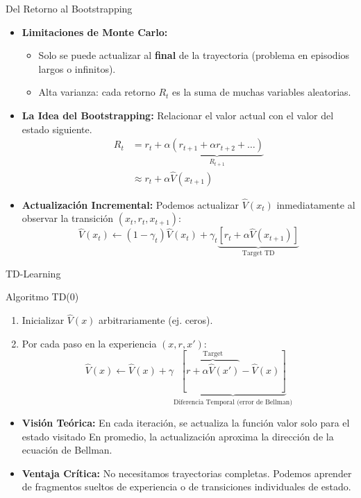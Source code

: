 \documentclass[xcolor=dvipsnames, handout]{beamer}
\begin{document}
\begin{frame}{Del Retorno al Bootstrapping}
\begin{itemize}
    \item \textbf{Limitaciones de Monte Carlo:}
    \begin{itemize}
        \item Solo se puede actualizar al \textbf{final} de la trayectoria (problema en episodios largos o infinitos).
        \item Alta varianza: cada retorno $R_t$ es la suma de muchas variables aleatorias.
    \end{itemize}
    
    \item<2-> \textbf{La Idea del Bootstrapping:} Relacionar el valor actual con el valor del estado siguiente.
    \[
    \begin{aligned}
    R_t &= r_t + \alpha \underbrace{(r_{t+1} + \alpha r_{t+2} + \dots)}_{R_{t+1}} \\
    &\approx r_t + \alpha \hat V(x_{t+1})
    \end{aligned}
    \]
    
    \item<3-> \textbf{Actualizaci\'on Incremental:} Podemos actualizar $\hat V(x_t)$ inmediatamente al observar la transici\'on $(x_t, r_t, x_{t+1})$:
    \[ \hat V(x_t) \leftarrow (1-\gamma_t)\hat V(x_t) + \gamma_t \underbrace{\left[ r_t + \alpha \hat V(x_{t+1}) \right]}_{\text{Target TD}} \]
\end{itemize}
\end{frame}

\begin{frame}{TD-Learning}
\begin{block}{Algoritmo TD(0)}
\begin{enumerate}
    \item Inicializar $\hat V(x)$ arbitrariamente (ej. ceros).
    \item Por cada paso en la experiencia $(x, r, x')$:
    \[ \hat V(x) \leftarrow \hat V(x) + \gamma \underbrace{\left[ \overbrace{r + \alpha \hat V(x')}^{\text{Target}} - \hat V(x) \right]}_{\text{Diferencia Temporal  (error de Bellman)}} \]
\end{enumerate}
\end{block}

\begin{itemize}
    \item<2-> \textbf{Visi\'on Te\'orica:} En cada iteraci\'on, se actualiza la funci\'on valor solo para el estado visitado  En promedio, la actualizaci\'on aproxima la direcci\'on de la ecuaci\'on de Bellman.
    \item<3-> \textbf{Ventaja Cr\'itica:} No necesitamos trayectorias completas. Podemos aprender de fragmentos sueltos de experiencia o de transiciones individuales de estado.
\end{itemize}
\end{frame}
\end{document}
